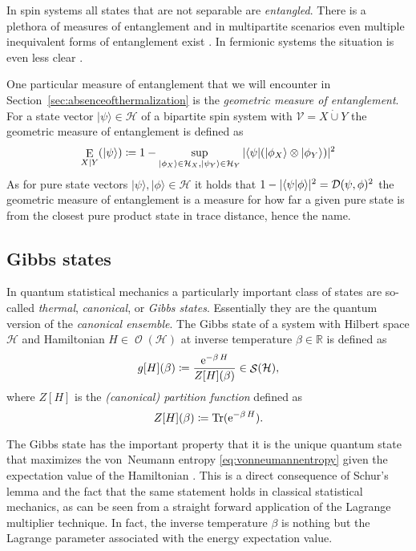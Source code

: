 \documentclass[a4paper,12pt,listof=totoc,index=totoc,bibliography=totoc,headsepline=false,headings=normal,BCOR16.153846mm,DIV12,headinclude,twoside,cleardoublepage=empty,numbers=noenddot,final]{scrreprt}
\theoremstyle{mystyle}
\numberwithin{equation}{section}
\numberwithin{figure}{section}
\numberwithin{lemma}{section}
\numberwithin{theorem}{section}
\numberwithin{corollary}{section}
\numberwithin{definition}{section}
\numberwithin{conjecture}{section}
\numberwithin{observation}{section}
\newcommand{\+}{\mkern2mu}
\newcommand{\coloneqq}{\mathrel{\vcentcolon\mkern-1.2mu=}} %
\newcommand{\dunion}{\mathbin{\dot{\cup}}}
\renewcommand{\H}{H}
\newcommand{\rhog}{g}
\newcommand{\Vset}{\mathcal{V}}
\newcommand{\bra}[1]{\langle #1|}
\newcommand{\ket}[1]{|#1\rangle}
\newcommand{\braket}[2]{\langle #1 | #2 \rangle}
\newcommand{\tracedistance}[3][]{
  \ifthenelse{\equal{#2}{}}
  {\ifthenelse{\equal{#3}{}}
    {\mathcal{D}_{#1}}{}
  }{
    \ifthenelse{\equal{#1}{}}
    {\operatorname{\mathcal{D}}(#2,#3)}
    {\operatorname{\mathcal{D}}_{#1}(#2,#3)}
  }
}
\DeclareMathOperator{\geometricentanglement}{E}
\newcommand{\e}{\mathrm{e}}
\DeclareMathOperator{\1}{\mathds{1}}
\DeclareMathOperator{\Obs}{\mathcal{O}}
\DeclareMathOperator{\Qst}{\mathcal{S}}
\DeclareMathOperator{\Tr}{Tr}
\newcommand{\mc}[1]{\mathcal{#1}}
\newcommand{\mcH}{\mc{H}}
\newcommand{\mb}[1]{\mathbb{#1}}
\newcommand{\R}{\mb{R}}
\begin{document}
In spin systems all states that are not separable are \emph{entangled}.
There is a plethora of measures of entanglement \cite{Plenio07} and in multipartite scenarios even multiple inequivalent forms of entanglement exist \cite{Horodecki2009}.
In fermionic systems the situation is even less clear \cite{Banuls2007}.

One particular measure of entanglement that we will encounter in Section~\ref{sec:absenceofthermalization} is the \emph{geometric measure of entanglement}.
For a state vector $\ket\psi \in \mcH$ of a bipartite spin system with $\Vset = X \dunion Y$ the geometric measure of entanglement is defined as \cite{Shimony95,Barnum2001,Wei2003}
\begin{equation} \label{eq:geometricmeasureofentanglementdefinition}
  \geometricentanglement_{X|Y}(\ket\psi) \coloneqq 1 - \sup_{\ket{\phi_X} \in \mcH_X,\ket{\psi_Y} \in \mcH_Y} |\bra{\psi} (\ket{\phi_X} \otimes \ket{\phi_Y})|^2
\end{equation}
As for pure state vectors $\ket\psi,\ket\phi \in \mcH$ it holds that $1 - |\braket\psi\phi|^2 = \tracedistance{\psi}{\phi}^2$ \cite[Section~9.2.2 and 9.2.3]{nielsenchuang} the geometric measure of entanglement is a measure for how far a given pure state is from the closest pure product state in trace distance, hence the name.


\subsection{Gibbs states}
\label{sec:gibbsstates}
%
In quantum statistical mechanics a particularly important class of states are so-called \emph{thermal}, \emph{canonical}, or \emph{Gibbs states}.
Essentially they are the quantum version of the \emph{canonical ensemble}.
The Gibbs state of a system with Hilbert space $\mcH$ and Hamiltonian $\H \in \Obs(\mcH)$ at inverse temperature $\beta \in \R$ is defined as
\begin{equation}
  \rhog[\H](\beta) \coloneqq \frac{\e^{-\beta\,\H}}{Z[\H](\beta)} \in \Qst(\mcH) ,
\end{equation}
where $Z[\H]$ is the \emph{(canonical) partition function} defined as
\begin{equation}
  Z[\H](\beta) \coloneqq \Tr(\e^{-\beta\,\H}) .
\end{equation}

The Gibbs state has the important property that it is the unique quantum state that maximizes the von~Neumann entropy \eqref{eq:vonneumannentropy} given the expectation value of the Hamiltonian \cite{thirringquantu}.
This is a direct consequence of Schur's lemma \cite{bhatia} and the fact that the same statement holds in classical statistical mechanics, as can be seen from a straight forward application of the Lagrange multiplier technique.
In fact, the inverse temperature $\beta$ is nothing but the Lagrange parameter associated with the energy expectation value.
\end{document}
